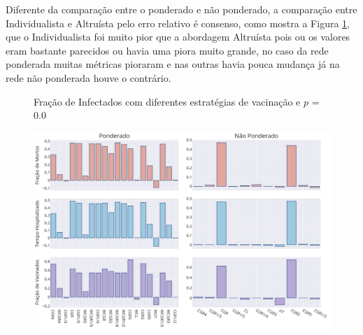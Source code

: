 Diferente da comparação entre o ponderado e não ponderado, a comparação entre Individualista e Altruísta pelo erro relativo é consenso, como mostra a Figura \ref{fig:compara_altruismo}, que o Individualista foi muito pior que a abordagem Altruísta pois ou os valores eram bastante parecidos ou havia uma piora muito grande, no caso da rede ponderada muitas métricas pioraram e nas outras havia pouca mudança já na rede não ponderada houve o contrário.

\begin{figure}[H]
    \centering
    \captionsetup{font=normalsize,skip=0.8pt,singlelinecheck=on,labelsep=endash}
    \caption{Fração de Infectados com diferentes estratégias de vacinação e $p$ = 0.0}
    
    \includegraphics[scale= 0.3]{figuras/compara_altruismo_0.0.png}
    \\
    \captionsetup{font=small,justification=justified}
    \caption*{}
    \label{fig:compara_altruismo}
\end{figure}